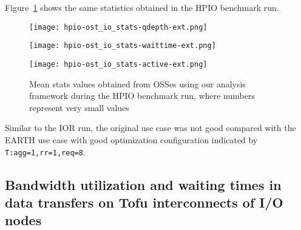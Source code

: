 \documentclass{jhps}
\begin{document}
Figure~\ref{fig:HPIO_OST_IO_STATS} shows the same statistics obtained
in the HPIO benchmark run.
%
\begin{figure}[tb]
\centering
\begin{minipage}[t]{0.44\textwidth}
 \centering
 \texttt{[image: hpio-ost\_io\_stats-qdepth-ext.png]}
 \label{fig:HPIO_req_qdepth}
\end{minipage}
%
\noindent
\begin{minipage}[t]{0.44\textwidth}
 \centering
 \texttt{[image: hpio-ost\_io\_stats-waittime-ext.png]}
 \label{fig:HPIO_req_waittime}
\end{minipage}
%
\noindent
\begin{minipage}[t]{0.44\textwidth}
 \centering
 \texttt{[image: hpio-ost\_io\_stats-active-ext.png]}
 \label{fig:HPIO_req_active}
\end{minipage}
%
\caption{Mean stats values obtained from OSSes using our analysis framework
during the HPIO benchmark run, where numbers represent very small values}
\label{fig:HPIO_OST_IO_STATS}
\end{figure}
%
Similar to the IOR run, the original use case was not good compared
with the EARTH use case with good optimization configuration
indicated by {\tt T:agg=1,rr=1,req=8}.

\subsection{Bandwidth utilization and waiting times in data transfers on Tofu interconnects of I/O nodes}
\end{document}
